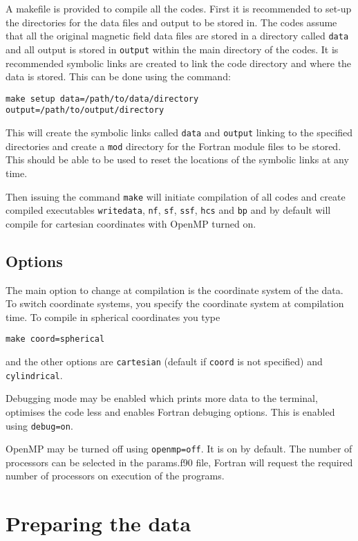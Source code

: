 \documentclass[12pt]{article}
\begin{document}
    A makefile is provided to compile all the codes. First it is recommended to set-up the directories for the data files and output to be stored in. The codes assume that all the original magnetic field data files are stored in a directory called \texttt{data} and all output is stored in \texttt{output} within the main directory of the codes. It is recommended symbolic links are created to link the code directory and where the data is stored. This can be done using the command:

    \texttt{make setup data=/path/to/data/directory output=/path/to/output/directory}

    This will create the symbolic links called \texttt{data} and \texttt{output} linking to the specified directories and create a \texttt{mod} directory for the Fortran module files to be stored. This should be able to be used to reset the locations of the symbolic links at any time.

    Then issuing the command \texttt{make} will initiate compilation of all codes and create compiled executables \texttt{writedata}, \texttt{nf}, \texttt{sf}, \texttt{ssf}, \texttt{hcs} and \texttt{bp} and by default will compile for cartesian coordinates with OpenMP turned on.

    \subsection{Options}

      The main option to change at compilation is the coordinate system of the data. To switch coordinate systems, you specify the coordinate system at compilation time. To compile in spherical coordinates you type

      \texttt{make coord=spherical}

      and the other options are \texttt{cartesian} (default if \texttt{coord} is not specified) and \texttt{cylindrical}.

      Debugging mode may be enabled which prints more data to the terminal, optimises the code less and enables Fortran debuging options. This is enabled using \texttt{debug=on}.

      OpenMP may be turned off using \texttt{openmp=off}. It is on by default. The number of processors can be selected in the params.f90 file, Fortran will request the required number of processors on execution of the programs.

  \section{Preparing the data}
\end{document}
